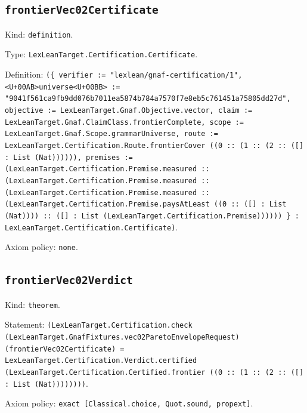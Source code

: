 \documentclass[11pt]{article}
\begin{document}
\subsection*{\texttt{frontierVec02Certificate}}
\noindent Kind: \texttt{definition}.\par
\noindent Type: \texttt{LexLeanTarget.Certification.Certificate}.\par
\noindent Definition: \texttt{(\{ verifier := "lexlean/gnaf-certification/1", <U+00AB>universe<U+00BB> := "9041f561ca9fb9dd076b7011ea5874b784a7570f7e8eb5c761451a75805dd27d", objective := LexLeanTarget.Gnaf.Objective.vector, claim := LexLeanTarget.Gnaf.ClaimClass.frontierComplete, scope := LexLeanTarget.Gnaf.Scope.grammarUniverse, route := LexLeanTarget.Certification.Route.frontierCover ((0 :: (1 :: (2 :: ([] : List (Nat)))))), premises := (LexLeanTarget.Certification.Premise.measured :: (LexLeanTarget.Certification.Premise.measured :: (LexLeanTarget.Certification.Premise.measured :: (LexLeanTarget.Certification.Premise.paysAtLeast ((0 :: ([] : List (Nat)))) :: ([] : List (LexLeanTarget.Certification.Premise)))))) \} : LexLeanTarget.Certification.Certificate)}.\par
\noindent Axiom policy: \texttt{none}.\par
\subsection*{\texttt{frontierVec02Verdict}}
\noindent Kind: \texttt{theorem}.\par
\noindent Statement: \texttt{(LexLeanTarget.Certification.check (LexLeanTarget.GnafFixtures.vec02ParetoEnvelopeRequest) (frontierVec02Certificate) = LexLeanTarget.Certification.Verdict.certified (LexLeanTarget.Certification.Certified.frontier ((0 :: (1 :: (2 :: ([] : List (Nat))))))))}.\par
\noindent Axiom policy: \texttt{exact [Classical.choice, Quot.sound, propext]}.\par
\end{document}
